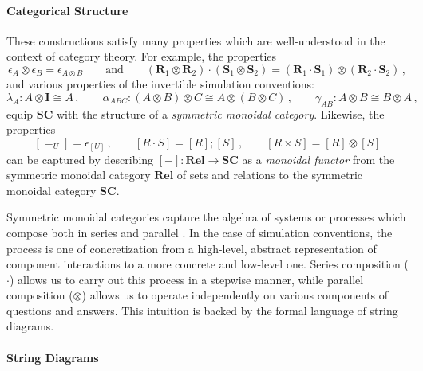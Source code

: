 \documentclass[acmsmall,screen,review,anonymous]{acmart}
\begin{document}
\paragraph{Categorical Structure} %

These constructions satisfy many properties
which are well-understood in the context of category theory.
For example, the properties
\[
  \epsilon_A \otimes \epsilon_B = \epsilon_{A \otimes B}
  \qquad \text{and}
  \qquad
  (\mathbf{R}_1 \otimes \mathbf{R}_2) \cdot
  (\mathbf{S}_1 \otimes \mathbf{S}_2) =
  (\mathbf{R}_1 \cdot \mathbf{S}_1) \otimes
  (\mathbf{R}_2 \cdot \mathbf{S}_2)
  \,,
\]
and various properties of the invertible simulation conventions:
\[
  \lambda_A : A \otimes \mathbf{I} \cong A \,,
  \qquad
  \alpha_{ABC} : (A \otimes B) \otimes C \cong A \otimes (B \otimes C) \,,
  \qquad
  \gamma_{AB} : A \otimes B \cong B \otimes A \,,
\]
equip %
$\mathbf{SC}$
with the structure of a \emph{symmetric monoidal category}.
Likewise, the properties
\[
  [{=}_U] = \epsilon_{[U]} \,,
  \qquad
  [R \cdot S] = [R] \mathbin; [S] \,,
  \qquad
  [R \times S] = [R] \otimes [S]
\]
can be captured by describing
$[-] : \mathbf{Rel} \rightarrow \mathbf{SC}$
as a \emph{monoidal functor}
from the symmetric monoidal category $\mathbf{Rel}$
of sets and relations
to the symmetric monoidal category $\mathbf{SC}$.

Symmetric monoidal categories capture
the algebra of systems or processes which
compose both in series and parallel
\cite{rosetta}.
In the case of simulation conventions,
the process is one of concretization
from a high-level, abstract representation
of component interactions
to a more concrete and low-level one.
Series composition ($\cdot$)
allows us to carry out this process in a stepwise manner,
while parallel composition ($\otimes$)
allows us to operate independently on various components
of questions and answers.
This intuition is backed by the formal language of string diagrams.


\paragraph{String Diagrams} %
\end{document}

